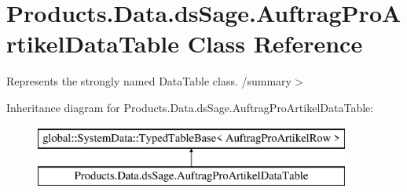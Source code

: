 \hypertarget{class_products_1_1_data_1_1ds_sage_1_1_auftrag_pro_artikel_data_table}{}\section{Products.\+Data.\+ds\+Sage.\+Auftrag\+Pro\+Artikel\+Data\+Table Class Reference}
\label{class_products_1_1_data_1_1ds_sage_1_1_auftrag_pro_artikel_data_table}


Represents the strongly named Data\+Table class. /summary$>$  


Inheritance diagram for Products.\+Data.\+ds\+Sage.\+Auftrag\+Pro\+Artikel\+Data\+Table\+:\begin{figure}[H]
\begin{center}
\leavevmode
\includegraphics[height=2.000000cm]{class_products_1_1_data_1_1ds_sage_1_1_auftrag_pro_artikel_data_table}
\end{center}
\end{figure}
